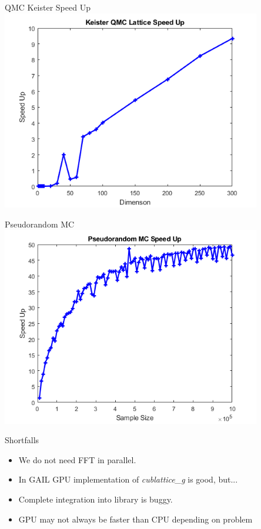 \documentclass[11pt]{beamer}
\begin{document}
\begin{frame}{QMC Keister Speed Up}
\centering
\includegraphics[width=0.85\textwidth]{Keister_speed.png} 
\end{frame}

\begin{frame}{Pseudorandom MC}
\centering
\includegraphics[width=0.85\textwidth]{pseudomcspeed.png} 
\end{frame}

\begin{frame}{Shortfalls}
\begin{itemize}
\item We do not need FFT in parallel.
\item In GAIL GPU implementation of \textit{cublattice\_g} is good, but...
\item Complete integration into library is buggy.
\item GPU may not always be faster than CPU depending on problem
\end{itemize}
\end{frame}
\end{document}
